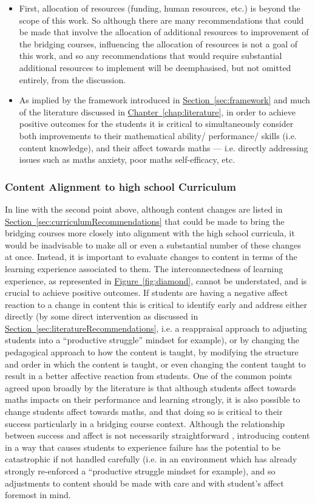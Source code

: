 \documentclass[twoside,12pt,a4paper]{report}
\newcommand{\refchap}[1]{\hyperref[chap:#1]{Chapter~\ref{chap:#1}}}
\newcommand{\refsec}[1]{\hyperref[sec:#1]{Section~\ref{sec:#1}}}
\newcommand{\reffig}[1]{\hyperref[fig:#1]{Figure~\ref{fig:#1}}}
\begin{document}
\begin{itemize}
	\item First, allocation of resources (funding, human resources, etc.) is beyond the scope of this work. So although there are many recommendations that could be made that involve the allocation of additional resources to improvement of the bridging courses, influencing the allocation of resources is not a goal of this work, and so any recommendations that would require substantial additional resources to implement will be deemphasised, but not omitted entirely, from the discussion.
	\item As implied by the framework introduced in \refsec{framework} and much of the literature discussed in \refchap{literature}, in order to achieve positive outcomes for the students it is critical to simultaneously consider both improvements to their mathematical ability/ performance/ skills (i.e. content knowledge), and their affect towards maths --- i.e. directly addressing issues such as maths anxiety, poor maths self-efficacy, etc.
\end{itemize}

\subsubsection{Content Alignment to high school Curriculum}

In line with the second point above, although content changes are listed in \refsec{curriculumRecommendations} that could be made to bring the bridging courses more closely into alignment with the high school curricula, it would be inadvisable to make all or even a substantial number of these changes at once. Instead, it is important to evaluate changes to content in terms of the learning experience associated to them. The interconnectedness of learning experience, as represented in \reffig{diamond}, cannot be understated, and is crucial to achieve positive outcomes. If students are having a negative affect reaction to a change in content this is critical to identify early and address either directly (by some direct intervention as discussed in \refsec{literatureRecommendations}, i.e. a reappraisal approach to adjusting students into a ``productive struggle'' mindset for example), or by changing the pedagogical approach to how the content is taught, by modifying the structure and order in which the content is taught, or even changing the content taught to result in a better affective reaction from students. One of the common points agreed upon broadly by the literature is that although students affect towards maths impacts on their performance and learning strongly, it is also possible to change students affect towards maths, and that doing so is critical to their success particularly in a bridging course context. Although the relationship between success and affect is not necessarily straightforward \cite{Jansen2013}, introducing content in a way that causes students to experience failure has the potential to be catastrophic if not handled carefully (i.e. in an environment which has already strongly re-enforced a ``productive struggle mindset for example), and so adjustments to content should be made with care and with student's affect foremost in mind.
\end{document}
